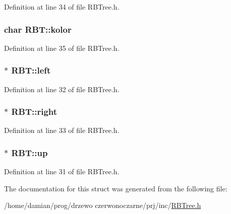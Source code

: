 Definition at line 34 of file R\-B\-Tree.\-h.

\hypertarget{struct_r_b_t_adf8bfca1acf1ecfbc77a1eeb7006bb80}{
\subsubsection[{kolor}]{\setlength{\rightskip}{0pt plus 5cm}char R\-B\-T\-::kolor}}\label{struct_r_b_t_adf8bfca1acf1ecfbc77a1eeb7006bb80}


Definition at line 35 of file R\-B\-Tree.\-h.

\hypertarget{struct_r_b_t_a3821fe7a316e01824a708ebba5ff7c00}{
\subsubsection[{left}]{$\ast$ R\-B\-T\-::left}}\label{struct_r_b_t_a3821fe7a316e01824a708ebba5ff7c00}


Definition at line 32 of file R\-B\-Tree.\-h.

\hypertarget{struct_r_b_t_a4518841b30b0f01bccee73c3266003b3}{
\subsubsection[{right}]{$\ast$ R\-B\-T\-::right}}\label{struct_r_b_t_a4518841b30b0f01bccee73c3266003b3}


Definition at line 33 of file R\-B\-Tree.\-h.

\hypertarget{struct_r_b_t_a386eea4c32988a3e82eb145cabc10636}{
\subsubsection[{up}]{$\ast$ R\-B\-T\-::up}}\label{struct_r_b_t_a386eea4c32988a3e82eb145cabc10636}


Definition at line 31 of file R\-B\-Tree.\-h.



The documentation for this struct was generated from the following file\-:\begin{DoxyCompactItemize}
\item 
/home/damian/prog/drzewo czerwonoczarne/prj/inc/\hyperlink{_r_b_tree_8h}{R\-B\-Tree.\-h}\end{DoxyCompactItemize}

